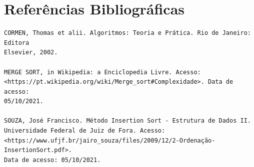 \documentclass[a4paper, 12pt]{article}
\begin{document}
\vspace{0.8cm}
\section{Referências Bibliográficas}
\begin{verbatim}
CORMEN, Thomas et alii. Algoritmos: Teoria e Prática. Rio de Janeiro: Editora 
Elsevier, 2002.

MERGE SORT, in Wikipedia: a Enciclopedia Livre. Acesso: 
<https://pt.wikipedia.org/wiki/Merge_sort#Complexidade>. Data de acesso: 
05/10/2021.

SOUZA, José Francisco. Método Insertion Sort - Estrutura de Dados II. 
Universidade Federal de Juiz de Fora. Acesso: 
<https://www.ufjf.br/jairo_souza/files/2009/12/2-Ordenação-InsertionSort.pdf>. 
Data de acesso: 05/10/2021.

\end{verbatim}
\end{document}
